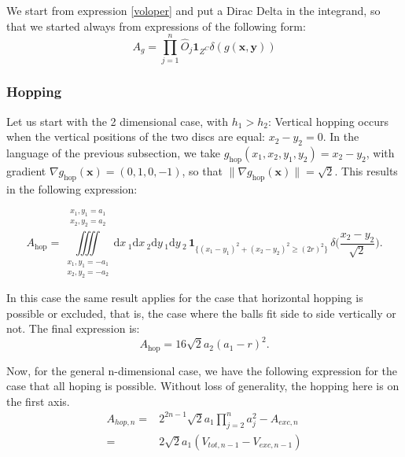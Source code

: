 \documentclass[superscriptaddress,pre,reprint,showpacs,twocolumn]{revtex4-1}
\newcommand{\rd}[1]{\mathrm{d}{#1} \,}
\newcommand{\indicatorsymbol}{\mathbf{1}}
\newcommand{\indicator}[1]{\indicatorsymbol_{ \{   #1 \} } }
\begin{document}
We start from expression \eqref{voloper} and put a Dirac Delta
in the integrand, so that we started always from expressions of the following
form:
\begin{equation}\label{areagral}
A_{g} = \prod_{j=1}^n \hat{O}_j \mathbf{1}_{Z^C} \delta(g(\mathbf{x, y}))
\end{equation}

\subsubsection{Hopping}

Let us start with the 2 dimensional case, with $h_1 > h_2$:
Vertical hopping occurs when the vertical positions of the two discs are equal: $x_2 - y_2=0$. In the language of the previous subsection, we take
 $g_\mathrm{hop}(x_1, x_2, y_1, y_2)= x_2 - y_2$, with gradient  $\nabla g_\mathrm{hop}(\mathbf{x}) = (0, 1, 0, -1)$, so that $ \| \nabla g_\mathrm{hop}(\mathbf{x}) \| = \sqrt{2}$. 
This results in the following expression:
\begin{widetext}
\begin{equation}
  A_\text{hop} =
\iiiint
\limits_{\substack{x_1, y_1 = -a_1 \\ x_2, y_2 = -a_2}}^{\substack{x_1, y_1 = a_1 \\ x_2, y_2 = a_2}}
\rd x_1 \rd x_2 \rd y_1 \rd y_2 
 \, \indicator{ (x_1-y_1)^2 + (x_2-y_2)^2 \ge (2r)^2 } \, \delta \big(\frac{x_2-y_2}{\sqrt{2}}\big).
\end{equation}
\end{widetext}
In this case the same result applies for the case that
horizontal hopping is possible or excluded, that is,
the case where the balls fit side to side vertically or not.
The final expression is:
 \begin{equation}\label{AreaH}
 A_\text{hop}  =  16 \sqrt{2} a_2(a_1-r)^2.
 \end{equation}

Now, for the general n-dimensional case, we have the following
expression for the case that all hoping is possible.
Without loss of generality, the hopping here is on the first axis.
\begin{equation}
  \begin{split}
    A_{hop,n}  = & 2^{2n-1}\sqrt{2}a_1\prod_{j=2}^n a_j^2-A_{exc,n} \\
      = & 2 \sqrt{2}a_1 (V_{tot,n-1} - V_{exc,n-1})
  \end{split} 
\end{equation}
\end{document}
